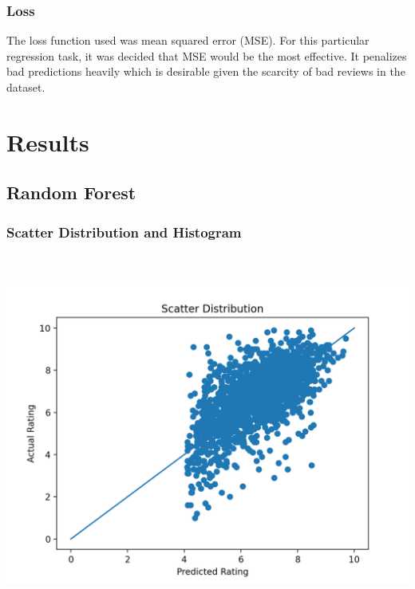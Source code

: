 \documentclass[11pt]{article}
\newcommand{\np}{\newpage}
\begin{document}
\subsubsection{Loss}
The loss function used was mean squared error (MSE).  For this particular regression task, it was decided that MSE would be the most effective.  It penalizes bad predictions heavily which is desirable given the scarcity of bad reviews in the dataset.
\np


\section{Results}
\subsection{Random Forest}
\subsubsection{Scatter Distribution and Histogram}
\mbox{}\\
\begin{minipage}{0.45\textwidth}
\includegraphics[scale=0.5]{bert/scatter.png}
\end{minipage}
\hfill
\end{document}
